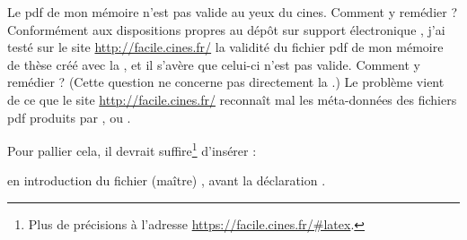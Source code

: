 \begin{dbfaq}{Le \acrshort{pdf} de mon mémoire n'est pas valide au yeux du
    \acrshort{cines}. Comment y remédier ?}{}
  Conformément aux dispositions propres au dépôt sur support électronique
  \autocite{guidoct-abes}, j'ai testé sur le site \url{http://facile.cines.fr/}
  la validité du fichier \acrshort{pdf} de mon mémoire de thèse créé avec la
  \yatCl{}, et il s'avère que celui-ci n'est pas valide. Comment y remédier ?
  \tcblower
  (Cette question ne concerne pas directement la \yatCl{}.) Le problème vient de
  ce que le site \url{http://facile.cines.fr/} reconnaît mal les méta-données
  des fichiers \acrshort{pdf} produits par ,  ou
  .

  Pour pallier cela, il devrait suffire\footnote{Plus de précisions à l'adresse
    \url{https://facile.cines.fr/\#latex}.} d'insérer :
\begin{preamblecode}
\end{preamblecode}
  en introduction du fichier (maître) , avant la déclaration
  .
\end{dbfaq}

